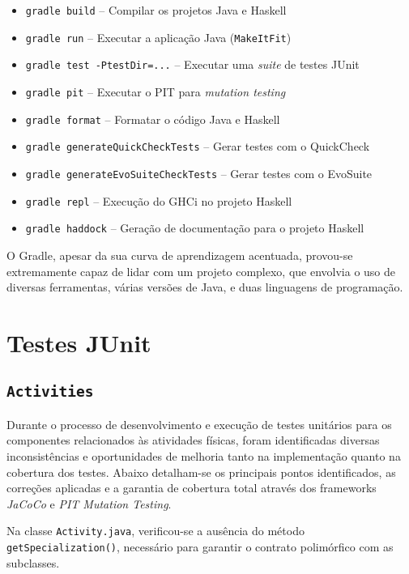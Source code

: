 \documentclass[12pt, a4paper]{article}
\begin{document}
\begin{itemize}
    \item \texttt{gradle build}              -- Compilar os projetos Java e Haskell
    \item \texttt{gradle run}                -- Executar a aplicação Java (\texttt{MakeItFit})
    \item \texttt{gradle test -PtestDir=...} -- Executar uma \emph{suite} de testes JUnit
    \item \texttt{gradle pit}                -- Executar o PIT para \emph{mutation testing}
    \item \texttt{gradle format}             -- Formatar o código Java e Haskell
    \vspace{1cm}
    \item \texttt{gradle generateQuickCheckTests}    -- Gerar testes com o QuickCheck
    \item \texttt{gradle generateEvoSuiteCheckTests} -- Gerar testes com o EvoSuite
    \vspace{1cm}
    \item \texttt{gradle repl}    -- Execução do GHCi no projeto Haskell
    \item \texttt{gradle haddock} -- Geração de documentação para o projeto Haskell
\end{itemize}

O Gradle, apesar da sua curva de aprendizagem acentuada, provou-se extremamente capaz de lidar com
um projeto complexo, que envolvia o uso de diversas ferramentas, várias versões de Java, e duas
linguagens de programação.

\section{Testes JUnit}

\subsection{\texttt{Activities}}

Durante o processo de desenvolvimento e execução de testes unitários para os componentes
relacionados às atividades físicas, foram identificadas diversas inconsistências e oportunidades de
melhoria tanto na implementação quanto na cobertura dos testes. Abaixo detalham-se os principais
pontos identificados, as correções aplicadas e a garantia de cobertura total através dos frameworks
\emph{JaCoCo} e \emph{PIT Mutation Testing}.

Na classe \texttt{Activity.java}, verificou-se a ausência do método \texttt{getSpecialization()},
necessário para garantir o contrato polimórfico com as subclasses.
\end{document}
